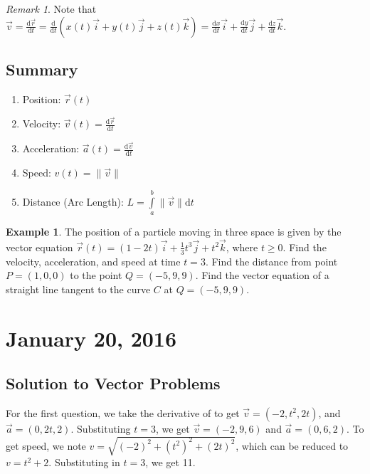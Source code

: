 \documentclass[11pt]{article}
\theoremstyle{plain} %
\theoremstyle{definition}
\theoremstyle{example}
\newtheorem*{example}{Example}
\theoremstyle{remark}
\newtheorem*{remark}{Remark}
\begin{document}
\begin{remark}
Note that $\vec{v} = \frac{\mathrm d \vec{r}}{\mathrm d t} = \frac{\mathrm d}{\mathrm d t} \left(x(t)\vec{i} + y(t)\vec{j} + z(t)\vec{k}\right) = \frac{\mathrm d x}{\mathrm d t} \vec{i} +  \frac{\mathrm d y}{\mathrm d t} \vec{j} + \frac{\mathrm d z}{\mathrm d t} \vec{k}$.
\end{remark}

\subsection{Summary}

\begin{enumerate}
	\item Position: $ \vec{r}(t)$
	\item Velocity: $\vec{v}(t) =\frac{ \mathrm d \vec{r} }{\mathrm d t}$
	\item Acceleration: $\vec{a}(t) = \frac{ \mathrm d \vec{v} }{\mathrm d t}$
	\item Speed: $v(t) = \|\vec{v}\|$
	\item Distance (Arc Length): $L = \int\limits_{a}^{b}\|\vec{v}\| \mathrm d t$
	
\end{enumerate}

\begin{example}The position of a particle moving in three space is given by the vector equation $\vec{r}(t) = (1-2t)\vec{i} + \frac{1}{3}t^3\vec{j} + t^2\vec{k}$, where $t \geq 0$. Find the velocity, acceleration, and speed at time $t=3$. Find the distance from point $P = (1, 0,0)$ to the point $Q = (-5, 9, 9)$. Find the vector equation of a straight line tangent to the curve $C$ at $Q = (-5,9,9)$. 
\end{example}

\section{January 20, 2016}
\subsection{Solution to Vector Problems}

For the first question, we take the derivative of to get $\vec{v} = \left(-2, t^2, 2t\right)$, and $\vec{a} = \left(0,2t,2\right)$. Substituting $t=3$, we get $\vec{v} = \left(-2, 9,6\right)$ and $\vec{a} = \left(0,6,2\right)$. To get speed, we note $v = \sqrt{(-2)^2+(t^2)^2+(2t)^2}$, which can be reduced to $v = t^2+2$. Substituting in $t=3$, we get 11. 
\end{document}

